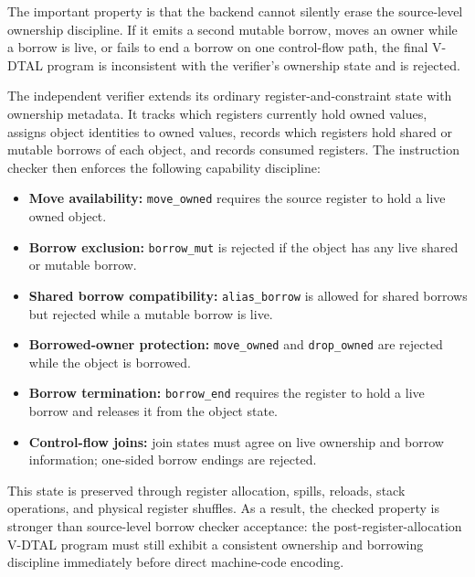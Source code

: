 The important property is that the backend cannot silently erase the source-level ownership discipline. If it emits a second mutable borrow, moves an owner while a borrow is live, or fails to end a borrow on one control-flow path, the final V-DTAL program is inconsistent with the verifier's ownership state and is rejected.


The independent verifier extends its ordinary register-and-constraint state with ownership metadata. It tracks which registers currently hold owned values, assigns object identities to owned values, records which registers hold shared or mutable borrows of each object, and records consumed registers. The instruction checker then enforces the following capability discipline:

\begin{itemize}
    \item \textbf{Move availability:} \texttt{move\_owned} requires the source register to hold a live owned object.
    \item \textbf{Borrow exclusion:} \texttt{borrow\_mut} is rejected if the object has any live shared or mutable borrow.
    \item \textbf{Shared borrow compatibility:} \texttt{alias\_borrow} is allowed for shared borrows but rejected while a mutable borrow is live.
    \item \textbf{Borrowed-owner protection:} \texttt{move\_owned} and \texttt{drop\_owned} are rejected while the object is borrowed.
    \item \textbf{Borrow termination:} \texttt{borrow\_end} requires the register to hold a live borrow and releases it from the object state.
    \item \textbf{Control-flow joins:} join states must agree on live ownership and borrow information; one-sided borrow endings are rejected.
\end{itemize}

This state is preserved through register allocation, spills, reloads, stack operations, and physical register shuffles. As a result, the checked property is stronger than source-level borrow checker acceptance: the post-register-allocation V-DTAL program must still exhibit a consistent ownership and borrowing discipline immediately before direct machine-code encoding.

